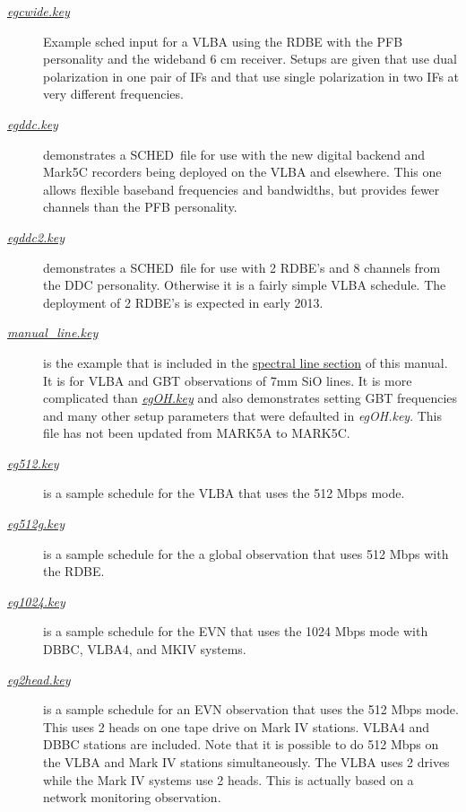 \documentclass{report}
\newcommand{\schedb}{{\sc SCHED~}}
\begin{document}
\begin{description}
\item[
{\href{examples/egcwide.key}{{\sl egcwide.key}}}]
Example sched input for a VLBA using the RDBE with the PFB personality
and the wideband 6 cm receiver.  Setups are given that use dual
polarization in one pair of IFs and that use single polarization in
two IFs at very different frequencies.

\item[
{\href{examples/egddc.key}{{\sl egddc.key}}}]
demonstrates a \schedb file for use with the new digital backend
and Mark5C recorders being deployed on the VLBA and elsewhere.
This one allows flexible baseband frequencies and bandwidths, but provides
fewer channels than the PFB personality.

\item[
{\href{examples/egddc2.key}{{\sl egddc2.key}}}]
demonstrates a \schedb file for use with 2 RDBE's and 8 channels
from the DDC personality.  Otherwise it is a fairly simple VLBA
schedule.  The deployment of 2 RDBE's is expected in early 2013.

\item[
{\href{examples/manual\_line.key}{{\sl manual\_line.key}}}]
is the example that is included in the 
{\hyperref[SEC:LINE]{spectral line section}} of this
manual.  It is for VLBA and GBT observations of 7mm SiO lines.  It
is more complicated than 
{\href{examples/egOH.key}{{\sl egOH.key}}}
and also demonstrates setting GBT
frequencies and many other setup parameters that were defaulted
in {\sl egOH.key}.  This file has not been updated from MARK5A to 
MARK5C.

\item[
{\href{examples/eg512.key}{{\sl eg512.key}}}] is a
sample schedule for the VLBA that uses the 512 Mbps mode.

\item[
{\href{examples/eg512g.key}{{\sl eg512g.key}}}] is a
sample schedule for the a global observation that uses 512 Mbps with
the RDBE.

\item[
{\href{examples/eg1024.key}{{\sl eg1024.key}}}] is a
sample schedule for the EVN that uses the 1024 Mbps mode with DBBC,
VLBA4, and MKIV systems.

\item[
{\href{examples/eg2head.key}{{\sl eg2head.key}}}] is
a sample schedule for an EVN observation that uses the 512 Mbps mode.
This uses 2 heads on one tape drive on Mark IV stations.  VLBA4 and
DBBC stations are included.  Note that it is possible to do 512 Mbps
on the VLBA and Mark IV stations simultaneously.  The VLBA uses 2
drives while the Mark IV systems use 2 heads.  This is actually based
on a network monitoring observation.


\end{description}
\end{document}
